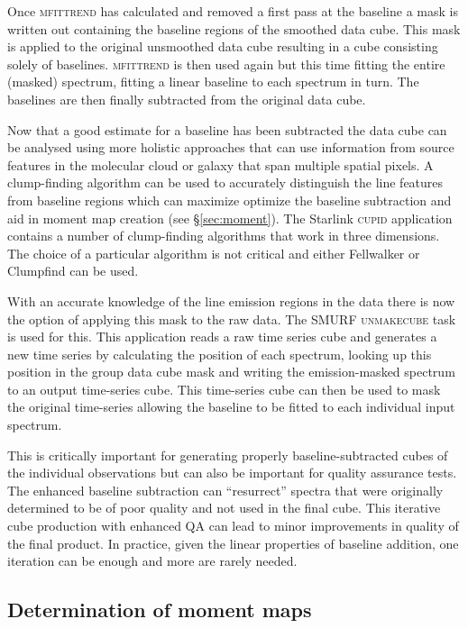 \documentclass[final,authoryear,5p,times,twocolumn]{elsarticle}
\begin{document}
Once \textsc{mfittrend} has calculated and removed a first pass at the
baseline a mask is written out containing the baseline regions of the
smoothed data cube. This mask is applied to the original
unsmoothed data cube resulting in a cube consisting solely of
baselines. \textsc{mfittrend} is then used again but this time fitting
the entire (masked) spectrum, fitting a linear baseline to each
spectrum in turn. The baselines are then finally subtracted from the
original data cube.

Now that a good estimate for a baseline has been subtracted the data
cube can be analysed using more holistic approaches that can use
information from source features in the molecular cloud or galaxy that
span multiple spatial pixels. A clump-finding algorithm can be used to
accurately distinguish the line features from baseline regions which
can maximize optimize the baseline subtraction and aid in moment map
creation (see \S \ref{sec:moment}). The Starlink \textsc{cupid}
\citep{2007ASPC..376..425B} application contains a number of
clump-finding algorithms that work in three dimensions. The choice of
a particular algorithm is not critical and either Fellwalker or
Clumpfind \citep{1994ApJ...428..693W} can be used.

With an accurate knowledge of the line emission regions in the data
there is now the option of applying this mask to the raw data. The
SMURF \textsc{unmakecube} task is used for this. This application
reads a raw time series cube and generates a new time series by
calculating the position of each spectrum, looking up this position in
the group data cube mask and writing the emission-masked spectrum to
an output time-series cube. This time-series cube can then be used to
mask the original time-series allowing the baseline to be fitted to
each individual input spectrum.

This is critically important for generating properly
baseline-subtracted cubes of the individual observations but can also
be important for quality assurance tests. The enhanced baseline
subtraction can ``resurrect'' spectra that were originally determined
to be of poor quality and not used in the final cube. This iterative
cube production with enhanced QA can lead to minor improvements in
quality of the final product.  In practice, given the linear
properties of baseline addition, one iteration can be enough and more
are rarely needed.

\subsection{Determination of moment maps \label{sec:moment}}
\end{document}
